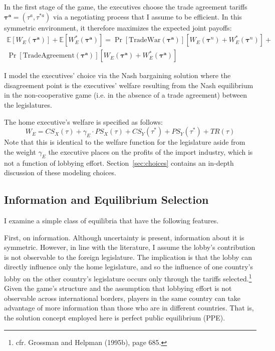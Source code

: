 \documentclass[10pt]{article}
\newcommand{\expect}{\mathbb{E}}
\newcommand{\bta}{\bm{\tau^a}}
\newcommand{\ga}{\gamma}
\begin{document}
In the first stage of the game, the executives choose the trade agreement tariffs $\bta=\left(\tau^a,\tau^{*a} \right)$ via a negotiating process that I assume to be efficient. In this symmetric environment, it therefore maximizes the expected joint payoffs:
\begin{multline}
  \expect \left[W_E(\bta) \right] + \expect \left[ W_E^{*}(\bta) \right] = \Pr\left[ \text{TradeWar}(\bta) \right] \left[W_E(\bm{\tau}^{\mathit{n}}) + W_E^*(\bm{\tau}^{\mathit{n}}) \right] + \\ \Pr\left[ \text{TradeAgreement}(\bta) \right] \left[W_E(\bta) + W_E^*(\bta) \right]
  \label{eq:jv}
\end{multline}

I model the executives' choice via the Nash bargaining solution where the disagreement point is the executives' welfare resulting from the Nash equilibrium in the non-cooperative game (i.e. in the absence of a trade agreement) between the legislatures.

The home executive's welfare is specified as follows:
\[
  W_E = \mathit{CS}_X(\tau) + \ga_E \cdot \mathit{PS}_X(\tau) + \mathit{CS}_Y(\tau^*) + \mathit{PS}_Y(\tau^*) + \mathit{TR}(\tau)
\]
Note that this is identical to the welfare function for the legislature aside from the weight $\ga_E$ the executive places on the profits of the import industry, which is not a function of lobbying effort. Section~\ref{sec:choices} contains an in-depth discussion of these modeling choices.


\subsection{Information and Equilibrium Selection}
\label{sec:info}
I examine a simple class of equilibria that have the following features.

First, on information. Although uncertainty is present, information about it is symmetric. However, in line with the literature, I assume the lobby's contribution is not observable to the foreign legislature. The implication is that the lobby can directly influence only the home legislature, and so the influence of one country's lobby on the other country's legislature occurs only through the tariffs selected.\footnote{cfr. Grossman and Helpman (1995b), page 685.} Given the game's structure and the assumption that lobbying effort is not observable across international borders, players in the same country can take advantage of more information than those who are in different countries. That is, the solution concept employed here is perfect public equilibrium (PPE).
\end{document}
